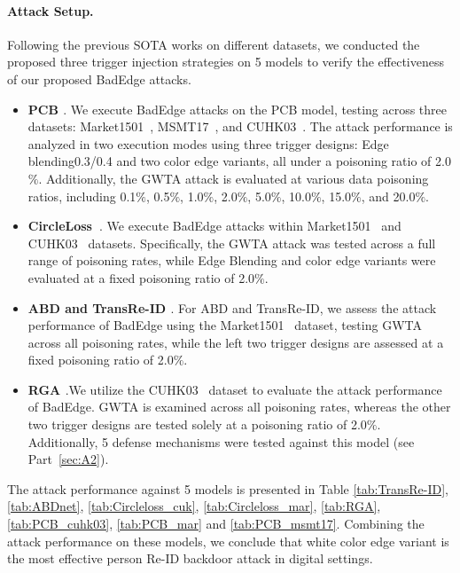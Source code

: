 \documentclass[sigconf,authordraft]{acmart}
\begin{document}
\paragraph{Attack Setup.} Following the previous SOTA works on different datasets, we conducted the proposed three trigger injection strategies on 5 models to verify the effectiveness of our proposed BadEdge attacks.
\begin{itemize}
\item \textbf{PCB \cite{sun2018beyond}}. We execute BadEdge attacks on the PCB model, testing across three datasets: Market1501~\cite{zhang2017alignedreid}, MSMT17~\cite{wei2018person}, and CUHK03~\cite{li2014deepreid}. The attack performance is analyzed in two execution modes using three trigger designs: Edge blending0.3/0.4 and two color edge variants, all under a poisoning ratio of 2.0$\%$. Additionally, the GWTA attack is evaluated at various data poisoning ratios, including 0.1$\%$, 0.5$\%$, 1.0$\%$, 2.0$\%$, 5.0$\%$, 10.0$\%$, 15.0$\%$, and 20.0$\%$.
\item \textbf{CircleLoss~\cite{sun2020circle}}. We execute BadEdge attacks within Market1501~\cite{zhang2017alignedreid} and CUHK03~\cite{li2014deepreid} datasets. Specifically, the GWTA attack was tested across a full range of poisoning rates, while Edge Blending and color edge variants were evaluated at a fixed poisoning ratio of 2.0$\%$.

\item  \textbf{ABD \cite{chen2019abd} and TransRe-ID \cite{he2021transreid}}.
For ABD and TransRe-ID, we assess the attack performance of BadEdge using the Market1501~\cite{zhang2017alignedreid} dataset, testing GWTA across all poisoning rates, while the left two trigger designs are assessed at a fixed poisoning ratio of 2.0$\%$.

\item \textbf{RGA \cite{zhang2020relation}}.We utilize the CUHK03~\cite{li2014deepreid} dataset to evaluate the attack performance of BadEdge. GWTA is examined across all poisoning rates, whereas the other two trigger designs are tested solely at a poisoning ratio of 2.0$\%$. Additionally, 5 defense mechanisms were tested against this model (see Part~\ref{sec:A2}).

\end{itemize}

The attack performance against 5 models is presented in Table \ref{tab:TransRe-ID}, \ref{tab:ABDnet}, \ref{tab:Circleloss_cuk}, \ref{tab:Circleloss_mar}, \ref{tab:RGA}, \ref{tab:PCB_cuhk03}, \ref{tab:PCB_mar}  and \ref{tab:PCB_msmt17}. Combining the attack performance on these models, we conclude that white color edge variant is the most effective person Re-ID backdoor attack in digital settings.
\end{document}
